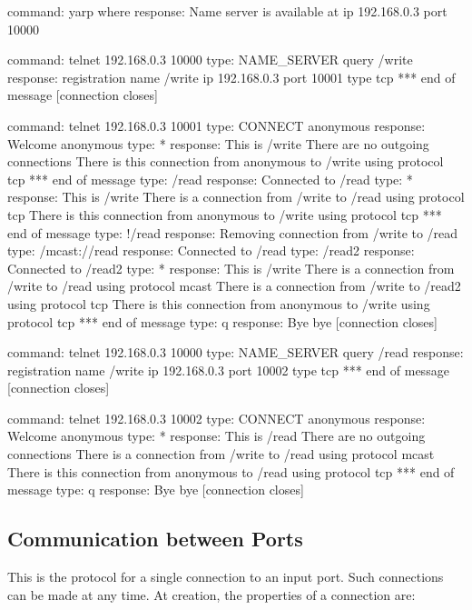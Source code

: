\documentclass[a4]{article}
\begin{document}
\begin{code}
command:  yarp where
response: Name server is available at ip 192.168.0.3 port 10000

command:  telnet 192.168.0.3 10000
type:     NAME_SERVER query /write
response: registration name /write ip 192.168.0.3 port 10001 type tcp
          *** end of message
          [connection closes]

command:  telnet 192.168.0.3 10001
type:     CONNECT anonymous
response: Welcome anonymous
type:     *
response: This is /write
          There are no outgoing connections
          There is this connection from anonymous to /write using protocol tcp
          *** end of message
type:     /read
response: Connected to /read
type:     *
response: This is /write
          There is a connection from /write to /read using protocol tcp
          There is this connection from anonymous to /write using protocol tcp
          *** end of message
type:     !/read
response: Removing connection from /write to /read
type:     /mcast://read
response: Connected to /read
type:     /read2
response: Connected to /read2
type:     *
response: This is /write
          There is a connection from /write to /read using protocol mcast
          There is a connection from /write to /read2 using protocol tcp
          There is this connection from anonymous to /write using protocol tcp
          *** end of message
type:     q
response: Bye bye
          [connection closes]

command:  telnet 192.168.0.3 10000
type:     NAME_SERVER query /read
response: registration name /write ip 192.168.0.3 port 10002 type tcp
          *** end of message
          [connection closes]

command:  telnet 192.168.0.3 10002
type:     CONNECT anonymous
response: Welcome anonymous
type:     *
response: This is /read
          There are no outgoing connections
          There is a connection from /write to /read using protocol mcast
          There is this connection from anonymous to /read using protocol tcp
          *** end of message
type:     q
response: Bye bye
          [connection closes]

\end{code}


\subsection{Communication between Ports}

This is the protocol for a single connection to an input port.
Such connections can be made at any time.  At creation,
the properties of a connection are:
\end{document}
